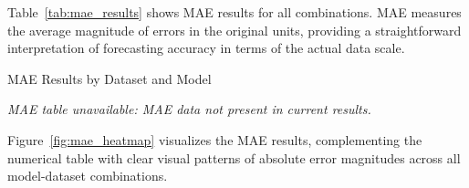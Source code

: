 \documentclass{article}
\begin{document}
\begin{appendices}
Table~\ref{tab:mae_results} shows MAE results for all combinations. MAE measures the average magnitude of errors in the original units, providing a straightforward interpretation of forecasting accuracy in terms of the actual data scale.

\begin{table}[htbp]
\centering
\caption{MAE Results by Dataset and Model}
\label{tab:mae_results}
% 
\textit{MAE table unavailable: MAE data not present in current results.}
\vspace{0.1cm}

\end{table}

Figure~\ref{fig:mae_heatmap} visualizes the MAE results, complementing the numerical table with clear visual patterns of absolute error magnitudes across all model-dataset combinations.






\end{appendices}
\end{document}
